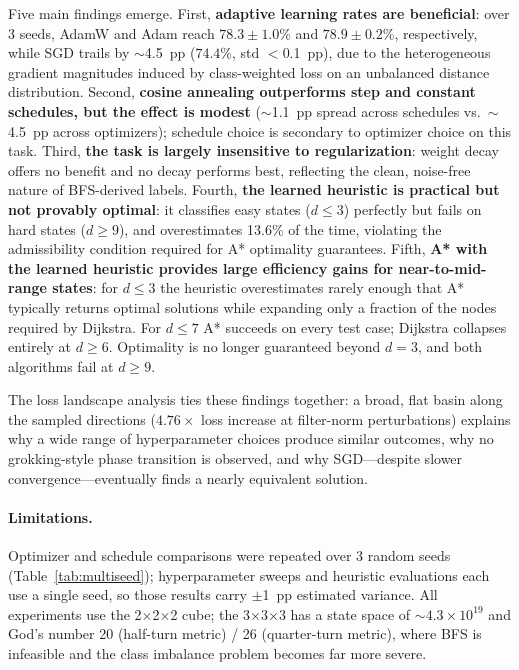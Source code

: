 \documentclass[11pt]{article}
\begin{document}
Five main findings emerge.
First, \textbf{adaptive learning rates are beneficial}: over 3 seeds, AdamW and
Adam reach $78.3\!\pm\!1.0$\% and $78.9\!\pm\!0.2$\%, respectively, while SGD
trails by $\sim$4.5~pp ($74.4$\%, std $<$0.1~pp), due to the heterogeneous gradient
magnitudes induced by class-weighted loss on an unbalanced distance distribution.
Second, \textbf{cosine annealing outperforms step and constant schedules, but
the effect is modest} ($\sim$1.1~pp spread across schedules vs.\ $\sim$4.5~pp
across optimizers); schedule choice is secondary to optimizer choice on this task.
Third, \textbf{the task is largely insensitive to regularization}: weight decay
offers no benefit and no decay performs best, reflecting the clean, noise-free
nature of BFS-derived labels.
Fourth, \textbf{the learned heuristic is practical but not provably optimal}:
it classifies easy states ($d \leq 3$) perfectly but fails on hard states
($d \geq 9$), and overestimates 13.6\% of the time, violating the admissibility condition
required for A* optimality guarantees.
Fifth, \textbf{A* with the learned heuristic provides large efficiency gains
for near-to-mid-range states}: for $d \leq 3$ the heuristic overestimates
rarely enough that A* typically returns optimal solutions while expanding only
a fraction of the nodes required by Dijkstra. For $d \leq 7$ A* succeeds on
every test case; Dijkstra collapses entirely at $d \geq 6$. Optimality is
no longer guaranteed beyond $d = 3$, and both algorithms fail at $d \geq 9$.

The loss landscape analysis ties these findings together: a broad, flat basin
along the sampled directions ($4.76\times$ loss increase at filter-norm perturbations) explains why
a wide range of hyperparameter choices produce similar outcomes, why no
grokking-style phase transition is observed, and why SGD---despite slower
convergence---eventually finds a nearly equivalent solution.

\paragraph{Limitations.}
Optimizer and schedule comparisons were repeated over 3 random seeds
(Table~\ref{tab:multiseed}); hyperparameter sweeps and heuristic evaluations
each use a single seed, so those results carry $\pm$1~pp estimated variance.
All experiments use the 2$\times$2$\times$2 cube; the
3$\times$3$\times$3 has a state space of $\sim$$4.3 \times 10^{19}$ and
God's number 20 (half-turn metric) / 26 (quarter-turn metric), where BFS is infeasible and the class imbalance problem
becomes far more severe.
\end{document}
